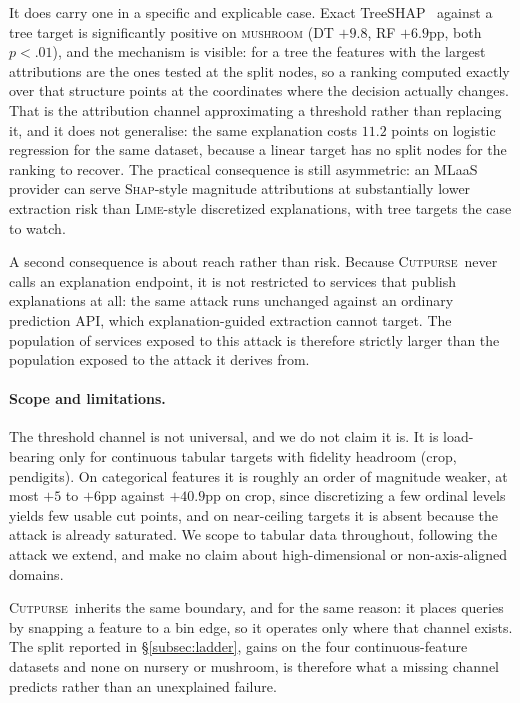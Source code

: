 \documentclass[sigconf,anonymous,review]{acmart}
\newcommand{\sys}{\textsc{Cutpurse}}
\begin{document}
It does carry one in a specific and explicable case. Exact
TreeSHAP~\cite{lundberg2020treeshap} against a tree target is
significantly positive on \textsc{mushroom} (DT $+9.8$, RF $+6.9$pp, both $p{<}.01$), and the
mechanism is visible: for a tree the features with the largest attributions are
the ones tested at the split nodes, so a ranking computed exactly over that structure points at the
coordinates where the decision actually changes. That is the attribution channel approximating a
threshold rather than replacing it, and it does not generalise: the same explanation costs
$11.2$ points on logistic regression for the same dataset, because a linear target has no split nodes
for the ranking to recover. The practical consequence is still asymmetric: an MLaaS provider can serve
\textsc{Shap}-style magnitude attributions at substantially lower extraction risk than
\textsc{Lime}-style discretized explanations, with tree targets the case to watch.

A second consequence is about reach rather than risk. Because \sys\ never calls an explanation
endpoint, it is not restricted to services that publish explanations at all: the same attack runs
unchanged against an ordinary prediction API, which explanation-guided extraction cannot target. The
population of services exposed to this attack is therefore strictly larger than the population exposed
to the attack it derives from.

\paragraph{Scope and limitations.} The threshold channel is not universal, and we do not claim it is.
It is load-bearing only for continuous tabular targets with fidelity headroom (crop, pendigits). On
categorical features it is roughly an order of magnitude weaker, at most $+5$ to $+6$pp against
$+40.9$pp on crop, since discretizing a few ordinal levels yields few usable cut points, and on
near-ceiling targets it is absent because the attack is already saturated. We scope to tabular data throughout, following the attack we extend, and make no
claim about high-dimensional or non-axis-aligned domains.

\sys\ inherits the same boundary, and for the same reason: it places queries by snapping a feature to
a bin edge, so it operates only where that channel exists. The split reported in
\S\ref{subsec:ladder}, gains on the four continuous-feature datasets and none on nursery or mushroom,
is therefore what a missing channel predicts rather than an unexplained failure.
\end{document}
